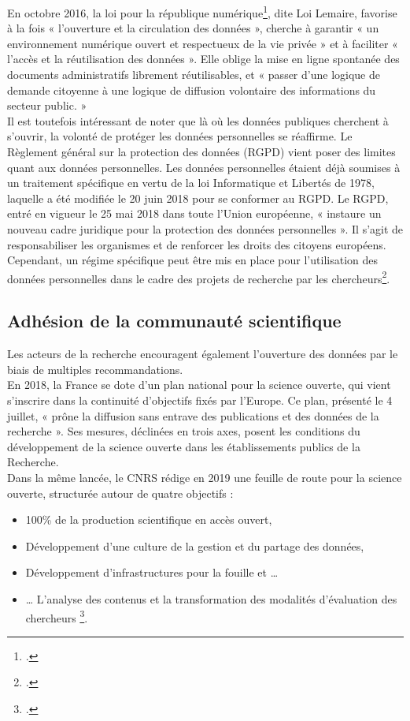 En octobre 2016, la loi pour la république numérique\footcite{LOI20161321Octobre2016}, dite Loi Lemaire, favorise à la fois « l’ouverture et la circulation des données », cherche à garantir « un environnement numérique ouvert et respectueux de la vie privée » et à faciliter « l'accès et la réutilisation des données ». Elle oblige la mise en ligne spontanée des documents administratifs librement réutilisables, et « passer d’une logique de demande citoyenne à une logique de diffusion volontaire des informations du secteur public. »\\

Il est toutefois intéressant de noter que là où les données publiques cherchent à s'ouvrir, la volonté de protéger les données personnelles se réaffirme. Le Règlement général sur la protection des données (RGPD) vient poser des limites quant aux données personnelles. Les données personnelles étaient déjà soumises à un traitement spécifique en vertu de la loi Informatique et Libertés de 1978, laquelle a été modifiée le 20 juin 2018 pour se conformer au RGPD. Le RGPD, entré en vigueur le 25 mai 2018 dans toute l'Union européenne, « instaure un nouveau cadre juridique pour la protection des données personnelles ». Il s'agit de responsabiliser les organismes et de renforcer les droits des citoyens européens. Cependant, un régime spécifique peut être mis en place pour l'utilisation des données personnelles dans le cadre des projets de recherche par les chercheurs\footcite{hadrossekGuideBonnesPratiques}.

        \subsection{Adhésion de la communauté scientifique}

Les acteurs de la recherche encouragent également l'ouverture des données par le biais de multiples recommandations. \\

En 2018, la France se dote d'un plan national pour la science ouverte, qui vient s'inscrire dans la continuité d'objectifs fixés par l'Europe. Ce plan, présenté le 4 juillet, « prône la diffusion sans entrave des publications et des données de la recherche ». Ses mesures, déclinées en trois axes, posent les conditions du développement de la science ouverte dans les établissements publics de la Recherche.\\

Dans la même lancée, le CNRS rédige en 2019 une feuille de route pour la science ouverte, structurée autour de quatre objectifs : 
\begin{itemize}
    \item 100\% de la production scientifique en accès ouvert,
    \item Développement d’une culture de la gestion et du partage des données, 
    \item Développement d’infrastructures pour la fouille et …
    \item … L’analyse des contenus et la transformation des modalités d’évaluation des chercheurs \footcite{ScienceOuverteCNRS}.
\end{itemize}

